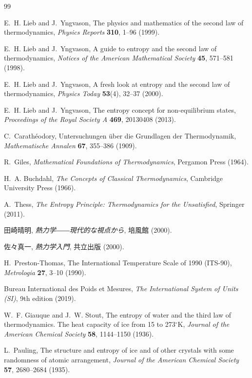 \begin{thebibliography}{99}

E.~H. Lieb and J.~Yngvason,
The physics and mathematics of the second law of thermodynamics,
\emph{Physics Reports} \textbf{310}, 1--96 (1999).

E.~H. Lieb and J.~Yngvason,
A guide to entropy and the second law of thermodynamics,
\emph{Notices of the American Mathematical Society} \textbf{45}, 571--581 (1998).

E.~H. Lieb and J.~Yngvason,
A fresh look at entropy and the second law of thermodynamics,
\emph{Physics Today} \textbf{53}(4), 32--37 (2000).

E.~H. Lieb and J.~Yngvason,
The entropy concept for non-equilibrium states,
\emph{Proceedings of the Royal Society A} \textbf{469}, 20130408 (2013).

C.~Carathéodory,
Untersuchungen über die Grundlagen der Thermodynamik,
\emph{Mathematische Annalen} \textbf{67}, 355--386 (1909).

R.~Giles,
\emph{Mathematical Foundations of Thermodynamics},
Pergamon Press (1964).

H.~A. Buchdahl,
\emph{The Concepts of Classical Thermodynamics},
Cambridge University Press (1966).

A.~Thess,
\emph{The Entropy Principle: Thermodynamics for the Unsatisfied},
Springer (2011).

田崎晴明,
\emph{熱力学――現代的な視点から},
培風館 (2000).

佐々真一,
\emph{熱力学入門},
共立出版 (2000).

H.~Preston-Thomas,
The International Temperature Scale of 1990 (ITS-90),
\emph{Metrologia} \textbf{27}, 3--10 (1990).

Bureau International des Poids et Mesures,
\emph{The International System of Units (SI)}, 9th edition (2019).

W.~F. Giauque and J.~W. Stout,
The entropy of water and the third law of thermodynamics. The heat capacity of ice from 15 to 273$^\circ$K,
\emph{Journal of the American Chemical Society} \textbf{58}, 1144--1150 (1936).

L.~Pauling,
The structure and entropy of ice and of other crystals with some randomness of atomic arrangement,
\emph{Journal of the American Chemical Society} \textbf{57}, 2680--2684 (1935).


\end{thebibliography}
